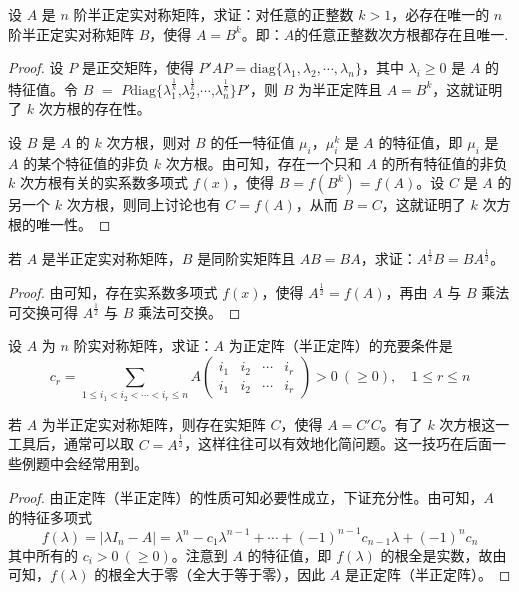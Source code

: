 \documentclass[../../main.tex]{subfiles}
\begin{document}
\begin{proposition}\label{proposition:例9.61}
设 \(A\) 是 \(n\) 阶半正定实对称矩阵，求证：对任意的正整数 \(k > 1\)，必存在唯一的 \(n\) 阶半正定实对称矩阵 \(B\)，使得 \(A = B^k\)。即：$A$的任意正整数次方根都存在且唯一.
\end{proposition}
\begin{proof}
设 \(P\) 是正交矩阵，使得 \(P'AP = \mathrm{diag}\{\lambda_1,\lambda_2,\cdots,\lambda_n\}\)，其中 \(\lambda_i \geq 0\) 是 \(A\) 的特征值。令 $B$ $=$ $P$$\mathrm{diag}$$\{$$\lambda_1^{\frac{1}{k}}$,$\lambda_2^{\frac{1}{k}}$,$\cdots$,$\lambda_n^{\frac{1}{k}}$$\}$$P'$，则 \(B\) 为半正定阵且 \(A = B^k\)，这就证明了 \(k\) 次方根的存在性。

设 \(B\) 是 \(A\) 的 \(k\) 次方根，则对 \(B\) 的任一特征值 \(\mu_i\)，\(\mu_i^k\) 是 \(A\) 的特征值，即 \(\mu_i\) 是 \(A\) 的某个特征值的非负 \(k\) 次方根。由可知，存在一个只和 \(A\) 的所有特征值的非负 \(k\) 次方根有关的实系数多项式 \(f(x)\)，使得 \(B = f(B^k) = f(A)\)。设 \(C\) 是 \(A\) 的另一个 \(k\) 次方根，则同上讨论也有 \(C = f(A)\)，从而 \(B = C\)，这就证明了 \(k\) 次方根的唯一性。 
\end{proof}

\begin{proposition}\label{proposition:例9.62}
若 \(A\) 是半正定实对称矩阵，\(B\) 是同阶实矩阵且 \(AB = BA\)，求证：\(A^{\frac{1}{2}}B = BA^{\frac{1}{2}}\)。
\end{proposition}
\begin{proof}
由可知，存在实系数多项式 \(f(x)\)，使得 \(A^{\frac{1}{2}} = f(A)\)，再由 \(A\) 与 \(B\) 乘法可交换可得 \(A^{\frac{1}{2}}\) 与 \(B\) 乘法可交换。
\end{proof}

\begin{proposition}\label{proposition:例9.63}
设 \(A\) 为 \(n\) 阶实对称矩阵，求证：\(A\) 为正定阵（半正定阵）的充要条件是
\[
c_r = \sum_{1\leq i_1 < i_2 < \cdots < i_r \leq n}A\begin{pmatrix}
i_1 & i_2 & \cdots & i_r \\
i_1 & i_2 & \cdots & i_r
\end{pmatrix} > 0\ (\geq 0),\quad 1\leq r \leq n
\]
\end{proposition}
\begin{remark}
若 \(A\) 为半正定实对称矩阵，则存在实矩阵 \(C\)，使得 \(A = C'C\)。有了 \(k\) 次方根这一工具后，通常可以取 \(C = A^{\frac{1}{2}}\)，这样往往可以有效地化简问题。这一技巧在后面一些例题中会经常用到。 
\end{remark}
\begin{proof}
由正定阵（半正定阵）的性质可知必要性成立，下证充分性。由可知，\(A\) 的特征多项式
\[
f(\lambda) = |\lambda I_n - A| = \lambda^n - c_1\lambda^{n - 1} + \cdots + (-1)^{n - 1}c_{n - 1}\lambda + (-1)^nc_n
\]
其中所有的 \(c_i > 0\ (\geq 0)\)。注意到 \(A\) 的特征值，即 \(f(\lambda)\) 的根全是实数，故由可知，\(f(\lambda)\) 的根全大于零（全大于等于零），因此 \(A\) 是正定阵（半正定阵）。
\end{proof}
\end{document}
